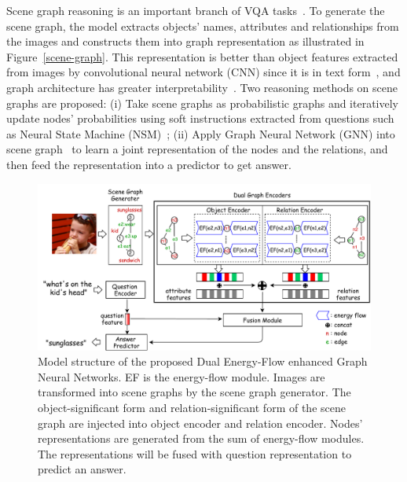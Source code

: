 \documentclass[letterpaper]{article} %
\begin{document}
Scene graph reasoning is an important branch of VQA tasks~\cite{DBLP:journals/corr/abs-2007-01072}. 
To generate the scene graph, the model extracts objects' names, attributes and relationships from the images and constructs them into graph representation as illustrated in Figure~\ref{scene-graph}. 
This representation is better than object features extracted from images by convolutional neural network (CNN) since it is in text form~\cite{DBLP:journals/corr/abs-2101-05479}, and graph architecture has greater interpretability~\cite{DBLP:conf/bmvc/ZhangCX19}.
Two reasoning methods on scene graphs are proposed: (i) Take scene graphs as probabilistic graphs and iteratively update nodes' probabilities using soft instructions extracted from questions such as Neural State Machine (NSM)~\cite{DBLP:conf/nips/HudsonM19,DBLP:conf/ijcnn/LeLV020}; (ii) Apply Graph Neural Network (GNN) into scene graph~\cite{inproceedings,DBLP:conf/iccv/LiGCL19} to learn a joint representation of the nodes and the relations, and then feed the representation into a predictor to get answer.
\begin{figure}[ht] 
    \vspace{-0.5in}
    \centering 
    \includegraphics[width=1.0\textwidth]{./pic/DE-GNN.pdf} 
    \caption{Model structure of the proposed Dual Energy-Flow enhanced Graph Neural Networks. EF is the energy-flow module. Images are transformed into scene graphs by the scene graph generator. The object-significant form and relation-significant form of the scene graph are injected into object encoder and relation encoder. Nodes' representations are generated from the sum of energy-flow modules. The representations will be fused with question representation to predict an answer.} 
    \label{fig2} 
    \vspace{-0.2in}
\end{figure}
\end{document}
